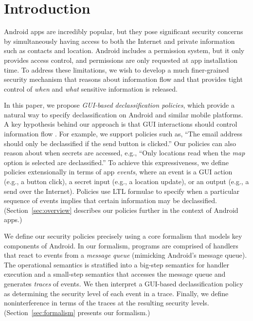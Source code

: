 \documentclass[10pt,conference,compsocconf]{IEEEtran}
\begin{document}


\section{Introduction}
\label{sec:introduction}

Android apps are incredibly popular, but they pose significant
security concerns by simultaneously having access to both the Internet
and private information such as contacts and location.  Android
includes a permission system, but it only provides access control, and
permissions are only requested at app installation time. To address
these limitations, we wish to develop a much finer-grained security
mechanism that reasons about information flow and that provides tight
control of \emph{when} and \emph{what} sensitive information is
released.

In this paper, we propose \emph{GUI-based declassification policies},
which provide a natural way to specify declassification on Android and
similar mobile platforms. A key hypothesis behind our approach is that
GUI interactions should control information flow
\cite{Roesner:12,Chen:13}. For example, we support policies such as,
``The email address should only be declassified if the send button is
clicked.''  Our policies can also reason about when secrets are
accessed, e.g., ``Only locations read when the \emph{map} option is
selected are declassified.'' To achieve this expressiveness, we define
policies extensionally in terms of app \emph{events}, where an event
is a GUI action (e.g., a button click), a secret input (e.g., a
location update), or an output (e.g., a send over the
Internet). Policies use LTL formulae \cite{Pnueli:1977} to
specify when a particular sequence of events implies that certain
information may be declassified. (Section~\ref{sec:overview} describes
our policies further in the context of Android apps.)

We define our security policies precisely using a core formalism that
models key components of Android. In our formalism, programs are
comprised of handlers that react to events from a \emph{message queue}
(mimicking Android's message queue). The operational semantics is
stratified into a big-step semantics for handler execution and a
small-step semantics that accesses the message queue and generates
\emph{traces} of events. We then interpret a GUI-based
declassification policy as determining the security level of each
event in a trace. Finally, we define noninterference in terms of the
traces at the resulting security levels.  (Section~\ref{sec:formalism}
presents our formalism.)
\end{document}
